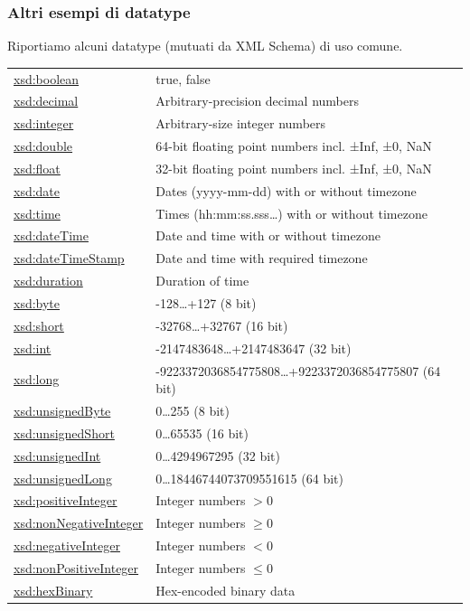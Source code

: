 \documentclass[8pt]{beamer}
\begin{document}
\begin{frame}
  \frametitle{Altri esempi di datatype}
  Riportiamo alcuni datatype (mutuati da XML Schema) di uso comune.

  \begin{small}
    \begin{tabular}{|l|l|}
    \hline
    \url{xsd:boolean} & true, false\\
    \url{xsd:decimal} & Arbitrary-precision decimal numbers\\
    \url{xsd:integer} & Arbitrary-size integer numbers\\
    \url{xsd:double} & 64-bit floating point numbers incl. ±Inf, ±0, NaN\\
    \url{xsd:float} & 32-bit floating point numbers incl. ±Inf, ±0, NaN\\
    \url{xsd:date} & Dates (yyyy-mm-dd) with or without timezone\\
    \url{xsd:time} & Times (hh:mm:ss.sss…) with or without timezone\\
    \url{xsd:dateTime} & Date and time with or without timezone\\
    \url{xsd:dateTimeStamp} & Date and time with required timezone\\
    \url{xsd:duration} & Duration of time\\
    \url{xsd:byte} & -128\ldots+127 (8 bit)\\
    \url{xsd:short} & -32768\ldots+32767 (16 bit) \\
    \url{xsd:int} & -2147483648\ldots+2147483647 (32 bit)\\
    \url{xsd:long} & -9223372036854775808\ldots+9223372036854775807 (64 bit)\\
    \url{xsd:unsignedByte} & 0\ldots255 (8 bit)\\
    \url{xsd:unsignedShort} & 0\ldots65535 (16 bit)\\
    \url{xsd:unsignedInt} & 0\ldots4294967295 (32 bit)\\
    \url{xsd:unsignedLong} & 0\ldots18446744073709551615 (64 bit)\\
    \url{xsd:positiveInteger} & Integer numbers $>0$\\
    \url{xsd:nonNegativeInteger} & Integer numbers $\geq 0$\\
    \url{xsd:negativeInteger} & Integer numbers $<0$\\
    \url{xsd:nonPositiveInteger} & Integer numbers $\leq 0$\\
    \url{xsd:hexBinary} & Hex-encoded binary data\\
    \hline
    \end{tabular}
  \end{small}
\end{frame}
\end{document}
